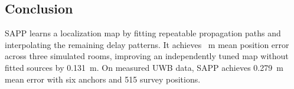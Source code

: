\documentclass[conference]{IEEEtran}
\begin{document}
\begin{samepage}
\section{Conclusion}
SAPP learns a localization map by fitting repeatable propagation paths and interpolating the remaining delay patterns. It achieves \MedianMean~m mean position error across three simulated rooms, improving an independently tuned map without fitted sources by 0.131~m. On measured UWB data, SAPP achieves 0.279~m mean error with six anchors and 515 survey positions.
\end{samepage}



\end{document}
